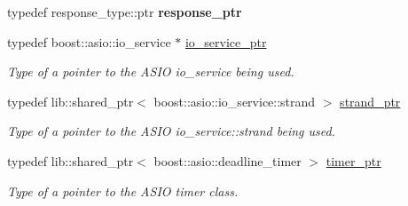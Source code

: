 \begin{DoxyCompactItemize}
\item 
typedef response\+\_\+type\+::ptr {\bfseries response\+\_\+ptr}\hypertarget{classwebsocketpp_1_1transport_1_1asio_1_1connection_a2ff953856756493592411577bb4640d2}{}\label{classwebsocketpp_1_1transport_1_1asio_1_1connection_a2ff953856756493592411577bb4640d2}

\item 
typedef boost\+::asio\+::io\+\_\+service $\ast$ \hyperlink{classwebsocketpp_1_1transport_1_1asio_1_1connection_a0276cb30af3a21d73b585d07cf6170a1}{io\+\_\+service\+\_\+ptr}\hypertarget{classwebsocketpp_1_1transport_1_1asio_1_1connection_a0276cb30af3a21d73b585d07cf6170a1}{}\label{classwebsocketpp_1_1transport_1_1asio_1_1connection_a0276cb30af3a21d73b585d07cf6170a1}

\begin{DoxyCompactList}\small\item\em Type of a pointer to the A\+S\+IO io\+\_\+service being used. \end{DoxyCompactList}\item 
typedef lib\+::shared\+\_\+ptr$<$ boost\+::asio\+::io\+\_\+service\+::strand $>$ \hyperlink{classwebsocketpp_1_1transport_1_1asio_1_1connection_a790e0c6b0cd50d26d7e803d4e274fe90}{strand\+\_\+ptr}\hypertarget{classwebsocketpp_1_1transport_1_1asio_1_1connection_a790e0c6b0cd50d26d7e803d4e274fe90}{}\label{classwebsocketpp_1_1transport_1_1asio_1_1connection_a790e0c6b0cd50d26d7e803d4e274fe90}

\begin{DoxyCompactList}\small\item\em Type of a pointer to the A\+S\+IO io\+\_\+service\+::strand being used. \end{DoxyCompactList}\item 
typedef lib\+::shared\+\_\+ptr$<$ boost\+::asio\+::deadline\+\_\+timer $>$ \hyperlink{classwebsocketpp_1_1transport_1_1asio_1_1connection_aa725ead0a0f3733f7f7e57076f194081}{timer\+\_\+ptr}\hypertarget{classwebsocketpp_1_1transport_1_1asio_1_1connection_aa725ead0a0f3733f7f7e57076f194081}{}\label{classwebsocketpp_1_1transport_1_1asio_1_1connection_aa725ead0a0f3733f7f7e57076f194081}

\begin{DoxyCompactList}\small\item\em Type of a pointer to the A\+S\+IO timer class. \end{DoxyCompactList}\end{DoxyCompactItemize}
